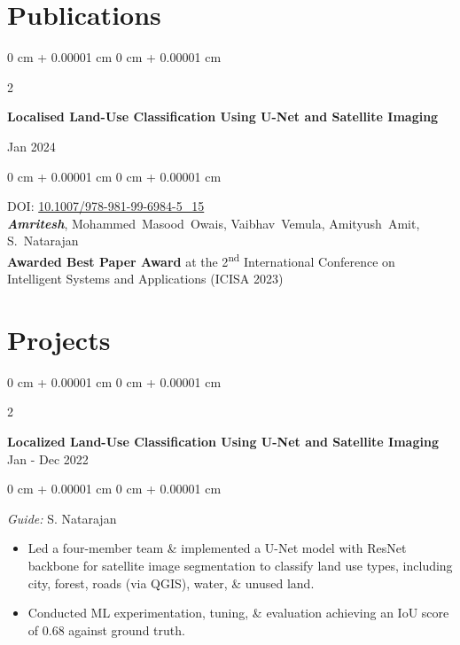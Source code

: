 \documentclass[10pt, a4paper]{article}
\newenvironment{highlights}{
    \begin{itemize}[
        topsep=0.10 cm,
        parsep=0.10 cm,
        partopsep=0pt,
        itemsep=0pt,
        leftmargin=0 cm + 10pt
    ]
}{
    \end{itemize}
} %
\newenvironment{onecolentry}{
    \begin{adjustwidth}{
        0 cm + 0.00001 cm
    }{
        0 cm + 0.00001 cm
    }
}{
    \end{adjustwidth}
} %
\newenvironment{twocolentry}[2][]{
    \onecolentry
    \def\secondColumn{#2}
    \setcolumnwidth{\fill, 6.0 cm}
    \begin{paracol}{2}
}{
    \switchcolumn \raggedleft \secondColumn
    \end{paracol}
    \endonecolentry
} %
\begin{document}
    \section{Publications}
        \begin{samepage}
            \begin{twocolentry}{
                Jan 2024
            }
                \textbf{Localised Land-Use Classification Using U-Net and Satellite Imaging}
            \end{twocolentry}

            \vspace{0.10 cm}
            
            \begin{onecolentry}
                DOI: \href{https://doi.org/10.1007/978-981-99-6984-5_15}{10.1007/978-981-99-6984-5\_15}\\
                \mbox{\textbf{\textit{Amritesh}}}, \mbox{Mohammed Masood Owais}, \mbox{Vaibhav Vemula},  \mbox{Amityush Amit},  \mbox{S. Natarajan}  \\
                \textbf{Awarded Best Paper Award} at the 2\textsuperscript{nd} International Conference on Intelligent Systems and Applications (ICISA 2023)

        \end{onecolentry}
        \end{samepage}

    \section{Projects}
        
        \begin{twocolentry}{
            Jan - Dec 2022
        }
            \textbf{Localized Land-Use Classification Using U-Net and Satellite Imaging}\end{twocolentry}

        \vspace{0.10 cm}
        \begin{onecolentry}
            \textit{Guide:} S. Natarajan\\
            \begin{highlights}
                \item Led a four-member team \& implemented a U-Net model with ResNet backbone for satellite image segmentation to classify land use types, including city, forest, roads (via QGIS), water, \& unused land.
                \item Conducted ML experimentation, tuning, \& evaluation achieving an IoU score of 0.68 against ground truth.
            \end{highlights}
        \end{onecolentry}
\end{document}
